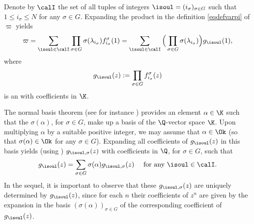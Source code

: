 Denote by $\calI $ the set of all tuples of integers $\isoul = (i_\sigma)_{\sigma\in G}$ such that $1 \leq i_\sigma \leq N$ for any $\sigma\in G$. Expanding the product in the definition \eqref{eqdefvarpi} of $\varpi$ yields
\begin{equation} \label{eqdefvp}
\varpi = \sum_{\isoul\in\calI}
\prod_{\sigma\in G} \sigma(\lambda_{i_\sigma}) f_{i_\sigma}^\sigma(1)
= \sum_{\isoul\in\calI}
\Big( \prod_{\sigma\in G} \sigma(\lambda_{i_\sigma})\Big) g_\isoul(1),
\end{equation}
where
\begin{equation} \label{eqdefgi}
g_\isoul(z) := \prod_{\sigma\in G} f_{i_\sigma}^\sigma(z)
\end{equation}
is an \Efunction with coefficients in $\K$.

The normal basis theorem (see for instance \cite[Th.\,5.18]{Milne}) provides an element $\alpha\in\K$ such that the $\sigma(\alpha)$, for $\sigma\in G$, make up a basis of the $\Q$-vector space $\K$. Upon multiplying $\alpha$ by a suitable positive integer, we may assume that $\alpha\in\Ok$ (so that $\sigma(\alpha)\in\Ok$ for any $\sigma\in G$). Expanding all coefficients of $ g_\isoul(z)$ in this basis yields (using \cite[Ch.\,3, Lem.\,12]{Shidlovskiilivre}) \Efunctions $ g_{\isoul,\sigma}(z)$ with coefficients in $\Q$, for $\sigma\in G$, such that
\begin{equation} \label{eqdcpgi}
g_\isoul(z) = \sum_{\sigma\in G} \sigma(\alpha)g_{\isoul,\sigma}(z)
\quad \mbox{ for any } \isoul\in\calI.
\end{equation}
In the sequel, it is important to observe that these \Efunctions $ g_{\isoul,\sigma}(z)$ are uniquely determined by $ g_\isoul(z)$, since for each $n$ their coefficients of $z^n$ are given by the expansion in the basis $(\sigma(\alpha))_{\sigma\in G}$ of the corresponding coefficient of $ g_\isoul(z)$.

